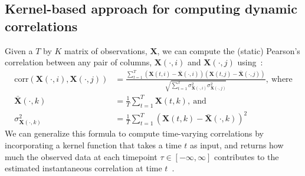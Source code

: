 \documentclass[english]{article}
\begin{document}
\subsection*{Kernel-based approach for computing dynamic correlations}
Given a $T$ by $K$ matrix of observations, $\mathbf{X}$, we can compute the (static)
Pearson's correlation between any pair of columns, $\mathbf{X}(\cdot, i)$ and
$\mathbf{X}(\cdot, j)$ using~\citep{Pear01}:
\begin{align}
  \mathrm{corr}(\mathbf{X}(\cdot, i), \mathbf{X}(\cdot, j)) &=
                                                              \frac{\sum_{t=1}^T
                                                              \left(\mathbf{X}(t,
                                                              i)
                                                              -
                                                              \bar{\mathbf{X}}(\cdot,
                                                              i)\right)
                                                              \left(\mathbf{X}(t,
                                                              j)
                                                              -
                                                              \bar{\mathbf{X}}(\cdot, j)\right)}{\sqrt{\sum_{t=1}^T
                                                              \sigma^2_{\mathbf{X}(\cdot, i)} 
                                                              \sigma^2_{\mathbf{X}(\cdot, j)}}},~\mathrm{where}\label{eqn:corr}\\
  \bar{\mathbf{X}}(\cdot, k) &= \frac{1}{T}\sum_{t=1}^T
                               \mathbf{X}(t, k),~\mathrm{and}\\
  \sigma^2_{\mathbf{X}(\cdot, k)} &= \frac{1}{T}\sum_{t=1}^T \left( \mathbf{X}(t, k) -
                                    \bar{\mathbf{X}}(\cdot, k) \right)^2 
\end{align}
We can generalize this formula to compute time-varying correlations by
incorporating a kernel function that takes a time $t$ as
input, and returns how much the observed data at each timepoint
$\tau \in \left[ -\infty, \infty \right]$ contributes to the estimated instantaneous
correlation at time $t$~\citep[Fig.~\ref{fig:kernels}; also see][for a
similar approach]{AlleEtal12b}.
\end{document}
